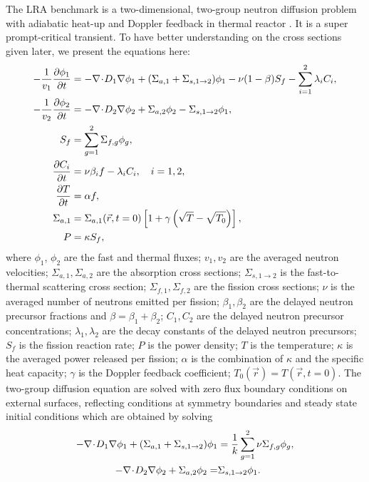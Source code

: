 The LRA benchmark is a two-dimensional, two-group neutron diffusion problem with adiabatic heat-up and Doppler feedback in thermal reactor \cite{ANL_BPB}.  It is a super prompt-critical transient.  To have better understanding on the cross sections given later, we present the equations here:
\begin{subequations}
\begin{align}
-\frac{1}{v_1} \frac{\partial \phi_1}{\partial t} &= -\mathbf{\nabla}\! \cdot \! D_1 \mathbf{\nabla}\phi_1 + (\Sigma_{a,1} + \Sigma_{s, 1\rightarrow 2})\phi_1 - \nu(1-\beta)S_f  - \sum_{i=1}^2 \lambda_i C_i, \\
-\frac{1}{v_2} \frac{\partial \phi_2}{\partial t} &= -\mathbf{\nabla}\! \cdot \! D_2 \mathbf{\nabla}\phi_2 + \Sigma_{a,2}\phi_2 - \Sigma_{s, 1\rightarrow 2}\phi_1, \\
S_f &= \sum_{g=1}^2 \Sigma_{f,g} \phi_g, \\
\frac{\partial C_i}{\partial t} &= \nu\beta_i f - \lambda_i C_i, \quad i=1,2, \\
\frac{\partial T}{\partial t} &= \alpha f, \label{eq:lra-temp} \\
\Sigma_{a,1} &= \Sigma_{a,1}(\vec{r}, t=0) \left[1+\gamma\left(\sqrt{T} - \sqrt{T_0}\right)\right], \\
P &= \kappa S_f,
\end{align}
\end{subequations}
where $\phi_1$, $\phi_2$ are the fast and thermal fluxes; $v_1, v_2$ are the averaged neutron velocities; $\Sigma_{a,1}, \Sigma_{a,2}$ are the absorption cross sections; $\Sigma_{s,1\rightarrow 2}$ is the fast-to-thermal scattering cross section; $\Sigma_{f,1}, \Sigma_{f,2}$ are the fission cross sections; $\nu$ is the averaged number of neutrons emitted per fission; $\beta_1, \beta_2$ are the delayed neutron precursor fractions and $\beta=\beta_1 + \beta_2$; $C_1, C_2$ are the delayed neutron precursor concentrations; $\lambda_1, \lambda_2$ are the decay constants of the delayed neutron precursors; $S_f$ is the fission reaction rate; $P$ is the power density; $T$ is the temperature; $\kappa$ is the averaged power released per fission; $\alpha$ is the combination of $\kappa$ and the specific heat capacity; $\gamma$ is the Doppler feedback coefficient; $T_0(\vec{r})=T(\vec{r}, t=0)$.
The two-group diffusion equation are solved with zero flux boundary conditions on external surfaces, reflecting conditions at symmetry boundaries and steady state initial conditions which are obtained by solving
\begin{align}
-\mathbf{\nabla}\! \cdot \! D_1 \mathbf{\nabla}\phi_1 + (\Sigma_{a,1} + \Sigma_{s, 1\rightarrow 2})\phi_1 &= \frac{1}{k}\sum_{g=1}^2 \nu\Sigma_{f,g}\phi_g, \\
-\mathbf{\nabla}\! \cdot \! D_2 \mathbf{\nabla}\phi_2 + \Sigma_{a,2}\phi_2 =& \Sigma_{s, 1\rightarrow 2}\phi_1.
\end{align}
